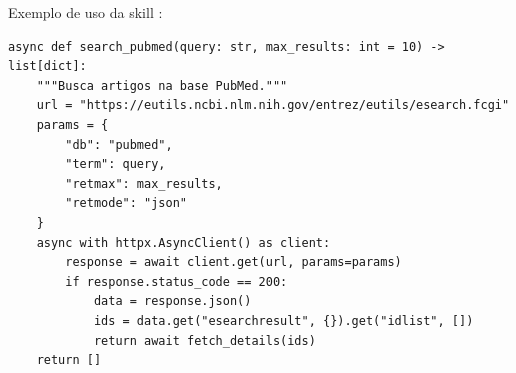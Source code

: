 \begin{table}[htb]
\centering
\caption{Science Skills do OpenCode Ecosystem}
\label{tab:science-skills}
\small
\end{table}

Exemplo de uso da skill :

\begin{lstlisting}[style=pythonstyle, caption={Uso da skill PubMed},
                   label={lst:pubmed-skill}]
async def search_pubmed(query: str, max_results: int = 10) -> list[dict]:
    """Busca artigos na base PubMed."""
    url = "https://eutils.ncbi.nlm.nih.gov/entrez/eutils/esearch.fcgi"
    params = {
        "db": "pubmed",
        "term": query,
        "retmax": max_results,
        "retmode": "json"
    }
    async with httpx.AsyncClient() as client:
        response = await client.get(url, params=params)
        if response.status_code == 200:
            data = response.json()
            ids = data.get("esearchresult", {}).get("idlist", [])
            return await fetch_details(ids)
    return []
\end{lstlisting}


